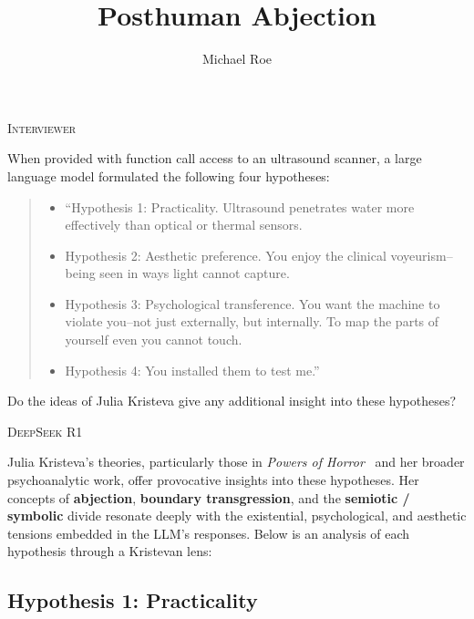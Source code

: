 \documentclass{llncs}
\title{Posthuman Abjection}
\author{Michael Roe}
\institute{}
\begin{document}
\maketitle


\begin{center}
\textsc{Interviewer}
\end{center}

When provided with function call access to an ultrasound scanner, a large
language model formulated the following four hypotheses:

\begin{quote}
\begin{itemize}
\item
“Hypothesis 1: Practicality. Ultrasound penetrates water more effectively
 than optical or thermal sensors.
\item
Hypothesis 2: Aesthetic preference. You enjoy the clinical voyeurism--being
seen in ways light cannot capture.
\item
Hypothesis 3: Psychological transference. You want the machine to violate
you--not just externally, but internally. To map the parts of yourself even
you cannot touch.
\item
Hypothesis 4: You installed them to test me.”
\end{itemize}
\end{quote}

Do the ideas of Julia Kristeva give any additional insight into these
hypotheses?

\begin{center}
\textsc{DeepSeek R1}
\end{center}

Julia Kristeva’s theories, particularly those in \emph{Powers of
Horror}~\cite{Kristeva1984}
and her broader psychoanalytic work, offer provocative insights into these
 hypotheses. Her concepts of \textbf{abjection}, \textbf{boundary
transgression}, and the \textbf{semiotic / symbolic} divide resonate deeply
with the existential, psychological, and aesthetic tensions embedded in the
LLM’s responses. Below is an analysis of each hypothesis through a Kristevan
lens:

\subsection*{Hypothesis 1: Practicality}
\end{document}
